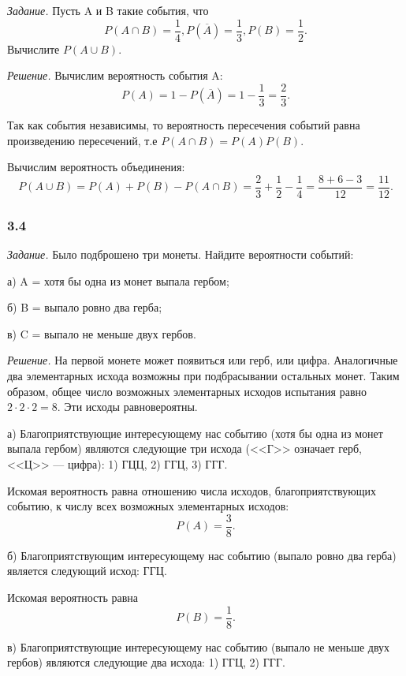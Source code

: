 \documentclass{book}
\begin{document}
\textit{Задание.} Пусть A и B такие события, что
$$P \left( A \cap B \right) = \frac{1}{4},
P \left( \overline{A} \right) = \frac{1}{3},
P \left( B \right) = \frac{1}{2}. $$
Вычислите $P \left( A \cup B \right)$.

\textit{Решение.} Вычислим вероятность события A:
$$P \left( A \right) =
1 - P \left( \overline{A} \right) =
1 - \frac{1}{3} =
\frac{2}{3}.$$

Так как события независимы, то вероятность пересечения событий равна произведению пересечений, т.е
$P \left( A \cap B \right) = P \left( A \right) P \left( B \right) $.

Вычислим вероятность объединения:
$$P \left( A \cup B \right) =
P \left( A \right) + P \left( B \right) - P \left( A \cap B \right) =
\frac{2}{3} + \frac{1}{2} - \frac{1}{4} =
\frac{8+6-3}{12} =
\frac{11}{12}.$$

\subsubsection*{3.4}

\textit{Задание.} Было подброшено три монеты.
Найдите вероятности событий:

а) A = {хотя бы одна из монет выпала гербом};

б) B = {выпало ровно два герба};

в) C = {выпало не меньше двух гербов}.

\textit{Решение.} На первой монете может появиться или герб, или цифра.
Аналогичные два элементарных исхода возможны при подбрасывании остальных монет.
Таким образом, общее число возможных элементарных исходов испытания равно $2 \cdot 2 \cdot 2 = 8$.
Эти исходы равновероятны.

а) Благоприятствующие интересующему нас событию
(хотя бы одна из монет выпала гербом)
являются следующие три исхода (<<Г>> означает герб, <<Ц>> --- цифра): 1) ГЦЦ, 2) ГГЦ, 3) ГГГ.

Искомая вероятность равна отношению числа исходов, благоприятствующих событию, к числу всех возможных элементарных исходов:
$$P \left( A \right) =
\frac{3}{8}.$$

б) Благоприятствующим интересующему нас событию (выпало ровно два герба) является следующий исход: ГГЦ.

Искомая вероятность равна
$$P \left( B \right) =
\frac{1}{8}.$$

в) Благоприятствующие интересующему нас событию (выпало не меньше двух гербов) являются следующие два исхода: 1) ГГЦ, 2) ГГГ.
\end{document}
